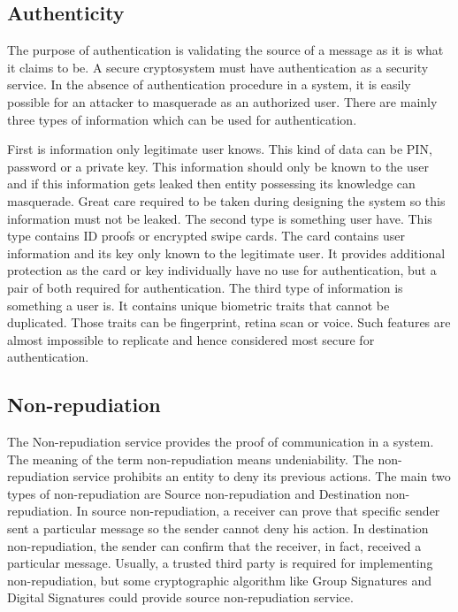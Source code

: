 \subsection{Authenticity}
The purpose of authentication is validating the source of a message as it is what it claims to be. A secure cryptosystem must have authentication as a security service. In the absence of authentication procedure in a system, it is easily possible for an attacker to masquerade as an authorized user. There are mainly three types of information which can be used for authentication.

First is information only legitimate user knows. This kind of data can be PIN, password or a private key. This information should only be known to the user and if this information gets leaked then entity possessing its knowledge can masquerade. Great care required to be taken during designing the system so this information must not be leaked. The second type is something user have. This type contains ID proofs or encrypted swipe cards. The card contains user information and its key only known to the legitimate user. It provides additional protection as the card or key individually have no use for authentication, but a pair of both required for authentication. The third type of information is something a user is. It contains unique biometric traits that cannot be duplicated. Those traits can be fingerprint, retina scan or voice. Such features are almost impossible to replicate and hence considered most secure for authentication.  
\subsection{Non-repudiation}
The Non-repudiation service provides the proof of communication in a system. The meaning of the term non-repudiation means undeniability. The non-repudiation service prohibits an entity to deny its previous actions. The main two types of non-repudiation are Source non-repudiation and Destination non-repudiation. In source non-repudiation, a receiver can prove that specific sender sent a particular message so the sender cannot deny his action. In destination non-repudiation, the sender can confirm that the receiver, in fact, received a particular message. Usually, a trusted third party is required for implementing non-repudiation, but some cryptographic algorithm like Group Signatures and Digital Signatures could provide source non-repudiation service. 

